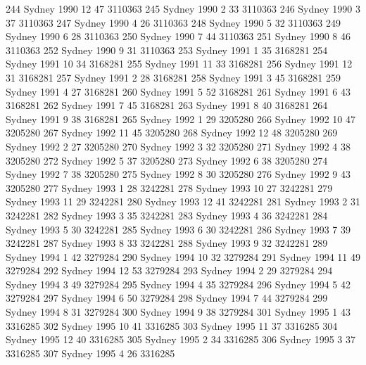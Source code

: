 \documentclass[a4paper]{article}                %
\begin{document}
\begin{Schunk}
\begin{Soutput}
244   Sydney  1990    12      47 3110363
245   Sydney  1990     2      33 3110363
246   Sydney  1990     3      37 3110363
247   Sydney  1990     4      26 3110363
248   Sydney  1990     5      32 3110363
249   Sydney  1990     6      28 3110363
250   Sydney  1990     7      44 3110363
251   Sydney  1990     8      46 3110363
252   Sydney  1990     9      31 3110363
253   Sydney  1991     1      35 3168281
254   Sydney  1991    10      34 3168281
255   Sydney  1991    11      33 3168281
256   Sydney  1991    12      31 3168281
257   Sydney  1991     2      28 3168281
258   Sydney  1991     3      45 3168281
259   Sydney  1991     4      27 3168281
260   Sydney  1991     5      52 3168281
261   Sydney  1991     6      43 3168281
262   Sydney  1991     7      45 3168281
263   Sydney  1991     8      40 3168281
264   Sydney  1991     9      38 3168281
265   Sydney  1992     1      29 3205280
266   Sydney  1992    10      47 3205280
267   Sydney  1992    11      45 3205280
268   Sydney  1992    12      48 3205280
269   Sydney  1992     2      27 3205280
270   Sydney  1992     3      32 3205280
271   Sydney  1992     4      38 3205280
272   Sydney  1992     5      37 3205280
273   Sydney  1992     6      38 3205280
274   Sydney  1992     7      38 3205280
275   Sydney  1992     8      30 3205280
276   Sydney  1992     9      43 3205280
277   Sydney  1993     1      28 3242281
278   Sydney  1993    10      27 3242281
279   Sydney  1993    11      29 3242281
280   Sydney  1993    12      41 3242281
281   Sydney  1993     2      31 3242281
282   Sydney  1993     3      35 3242281
283   Sydney  1993     4      36 3242281
284   Sydney  1993     5      30 3242281
285   Sydney  1993     6      30 3242281
286   Sydney  1993     7      39 3242281
287   Sydney  1993     8      33 3242281
288   Sydney  1993     9      32 3242281
289   Sydney  1994     1      42 3279284
290   Sydney  1994    10      32 3279284
291   Sydney  1994    11      49 3279284
292   Sydney  1994    12      53 3279284
293   Sydney  1994     2      29 3279284
294   Sydney  1994     3      49 3279284
295   Sydney  1994     4      35 3279284
296   Sydney  1994     5      42 3279284
297   Sydney  1994     6      50 3279284
298   Sydney  1994     7      44 3279284
299   Sydney  1994     8      31 3279284
300   Sydney  1994     9      38 3279284
301   Sydney  1995     1      43 3316285
302   Sydney  1995    10      41 3316285
303   Sydney  1995    11      37 3316285
304   Sydney  1995    12      40 3316285
305   Sydney  1995     2      34 3316285
306   Sydney  1995     3      37 3316285
307   Sydney  1995     4      26 3316285

\end{Soutput}
\end{Schunk}
\end{document}
